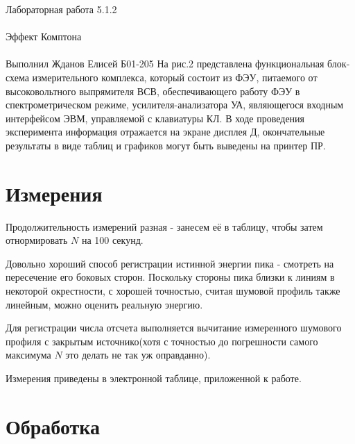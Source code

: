 \documentclass{astroedu-lab}
\begin{document}
\begin{problem}{\huge Лабораторная работа 5.1.2\\\\Эффект Комптона\\\\Выполнил Жданов Елисей Б01-205}
	На рис.2 представлена функциональная блок-схема измерительного комплекса, который состоит из ФЭУ, питаемого от высоковольтного выпрямителя ВСВ, обеспечивающего работу ФЭУ в спектрометрическом режиме, усилителя-анализатора УА, являющегося входным интерфейсом ЭВМ, управляемой с клавиатуры КЛ. В ходе проведения эксперимента информация отражается на экране дисплея Д, окончательные результаты в виде таблиц и графиков могут быть выведены на принтер ПР.
	

\section{Измерения}

Продолжительность измерений разная - занесем её в таблицу, чтобы затем отнормировать $N$ на 100 секунд.

Довольно хороший способ регистрации истинной энергии пика - смотреть на пересечение его боковых сторон. Поскольку стороны пика близки к линиям в некоторой окрестности, с хорошей точностью, считая шумовой профиль также линейным, можно оценить реальную энергию.

Для регистрации числа отсчета выполняется вычитание измеренного шумового профиля с закрытым источнико(хотя с точностью до погрешности самого максимума $N$ это делать не так уж оправданно). 

Измерения приведены в электронной таблице, приложенной к работе.


\section{Обработка}


\end{problem}
\end{document}
